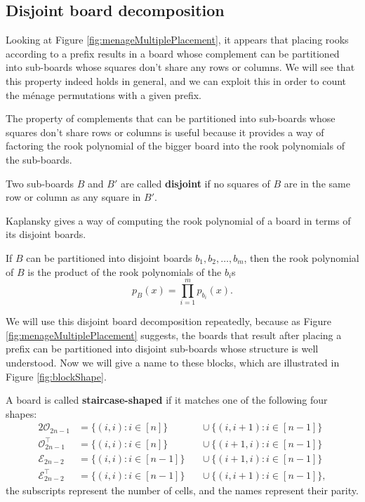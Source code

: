 \subsection{Disjoint board decomposition}
Looking at Figure \ref{fig:menageMultiplePlacement},
it appears that placing rooks according to a prefix
results in a board whose complement can be partitioned into
sub-boards whose squares don't share any rows or columns.
We will see that this property indeed holds in general,
and we can exploit this in order to count the m\'enage permutations
with a given prefix.



The property of complements that can be partitioned into sub-boards
whose squares don't share rows or columns is useful because it provides
a way of factoring the rook polynomial of the bigger board into the rook
polynomials of the sub-boards.
\begin{definition}
  Two sub-boards $B$ and $B'$ are called \textbf{disjoint} if no squares of $B$ are
  in the same row or column as any square in $B'$.
\end{definition}

Kaplansky gives a way of computing the rook polynomial of a board in terms of
its disjoint boards.
\begin{theorem}
  If $B$ can be partitioned into disjoint boards $b_1, b_2, \dots, b_m$,
  then the rook polynomial of $B$ is the product of the rook polynomials of
  the $b_i$s \[
    p_B(x) = \prod_{i=1}^m p_{b_i}(x).
  \]
\end{theorem}

We will use this disjoint board decomposition repeatedly, because as
Figure \ref{fig:menageMultiplePlacement} suggests, the boards that result
after placing a prefix can be partitioned into disjoint sub-boards whose
structure is well understood. Now we will give a name to these blocks,
which are illustrated in Figure \ref{fig:blockShape}.



\begin{definition}
  A board is called \textbf{staircase-shaped} if it matches one of the
  following four shapes:
  \begin{alignat*}{2}
    \mathcal{O}_{2n-1}           &= \{(i,i) : i \in [n]\}    &&\cup\ \{(i,i+1) : i \in [n-1]\} \\
    \mathcal{O}_{2n-1}^\intercal &= \{(i,i) : i \in [n]\}    &&\cup\ \{(i+1,i) : i \in [n-1]\} \\
    \mathcal{E}_{2n-2}           &= \{(i,i) : i \in [n-1]\}\ &&\cup\ \{(i+1,i) : i \in [n-1]\} \\
    \mathcal{E}_{2n-2}^\intercal &= \{(i,i) : i \in [n-1]\}\ &&\cup\ \{(i,i+1) : i \in [n-1]\},
  \end{alignat*}
  the subscripts represent the number of cells, and the names represent their
  parity.
  \label{def:staircaseShaped}
\end{definition}

